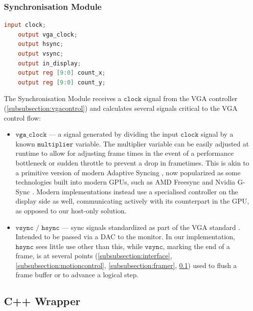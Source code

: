 \subsubsection{Synchronisation Module}
\label{subsubsection:vgasync}
%
\begin{lstlisting}[language=Verilog]
    input clock;
    output vga_clock;
    output hsync;              
    output vsync;               
    output in_display;          
    output reg [9:0] count_x;
    output reg [9:0] count_y;
\end{lstlisting}

The Synchronisation Module receives a \(\texttt{clock}\) signal from
the VGA controller (\ref{subsubsection:vgacontrol}) and calculates several
signals critical to the VGA control flow:

\begin{itemize}
    \item \(\texttt{vga\_clock}\) --- a signal generated by dividing the 
            input \(\texttt{clock}\) signal by a known \(\texttt{multiplier}\)
            variable. The multiplier variable can be easily adjusted at runtime
            to allow for adjusting frame times in the event of a performance
            bottleneck or sudden throttle to prevent a drop in frametimes. This
            is akin to a primitive version of modern Adaptive Syncing \cite{varrefresh},
            now popularized as some technologies built into modern GPUs,
            such as AMD Freesync \cite{freesync} and Nvidia G-Sync \cite{gsync}. 
            Modern implementations instead use a specialised controller on the display
            side as well, communicating actively with its counterpart in the GPU,
            as opposed to our host-only solution.
    \item \(\texttt{vsync / hsync}\) --- sync signals standardized as part of the VGA
            standard \cite{vgastandard}. Intended to be passed via a DAC to the monitor.
            In our implementation, \(\texttt{hsync}\) sees little use other than this,
            while \(\texttt{vsync}\), marking the end of a frame, is at several points 
            (\ref{subsubsection:interface}, \ref{subsubsection:motioncontrol}, \ref{subsubsection:framer}, 
            \ref{subsection:cppwrap}) used to flush a frame buffer or to advance a logical step.
\end{itemize}


\subsection{C++ Wrapper}
\label{subsection:cppwrap}

